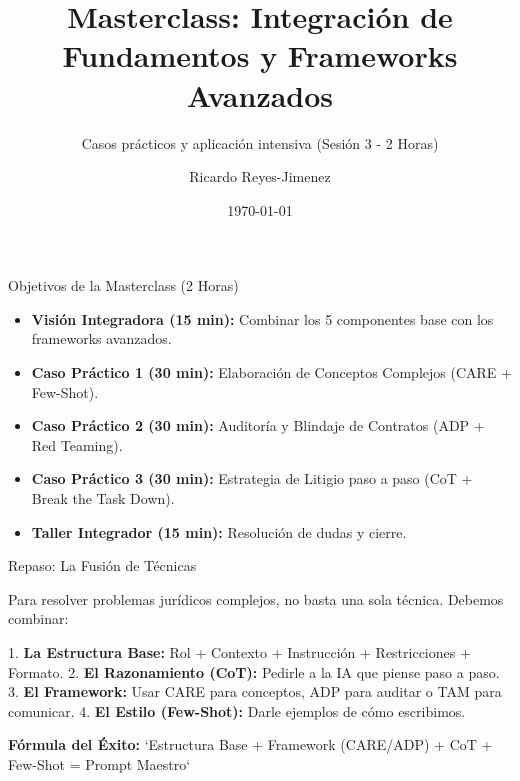 \documentclass[aspectratio=169]{beamer}
\title[ Masterclass]{ Masterclass: Integración de Fundamentos y Frameworks Avanzados}
\subtitle{ Casos prácticos y aplicación intensiva (Sesión 3 - 2 Horas)}
\author{Ricardo Reyes-Jimenez}
\institute{Universidad de La Sabana}
\date{\today}
\begin{document}
\begin{frame}
  \titlepage
\end{frame}

\usebackgroundtemplate{}



\begin{frame}[fragile]{Objetivos de la Masterclass (2 Horas)}


\begin{itemize}
  \item \textbf{Visión Integradora (15 min):} Combinar los 5 componentes base con los frameworks avanzados.
  \item \textbf{Caso Práctico 1 (30 min):} Elaboración de Conceptos Complejos (CARE + Few-Shot).
  \item \textbf{Caso Práctico 2 (30 min):} Auditoría y Blindaje de Contratos (ADP + Red Teaming).
  \item \textbf{Caso Práctico 3 (30 min):} Estrategia de Litigio paso a paso (CoT + Break the Task Down).
  \item \textbf{Taller Integrador (15 min):} Resolución de dudas y cierre.
\end{itemize}
\end{frame}



\begin{frame}[fragile]{Repaso: La Fusión de Técnicas}


Para resolver problemas jurídicos complejos, no basta una sola técnica. Debemos combinar:

1. \textbf{La Estructura Base:} Rol + Contexto + Instrucción + Restricciones + Formato.
2. \textbf{El Razonamiento (CoT):} Pedirle a la IA que piense paso a paso.
3. \textbf{El Framework:} Usar CARE para conceptos, ADP para auditar o TAM para comunicar.
4. \textbf{El Estilo (Few-Shot):} Darle ejemplos de cómo escribimos.

\textbf{Fórmula del Éxito:} `Estructura Base + Framework (CARE/ADP) + CoT + Few-Shot = Prompt Maestro`

\end{frame}
\end{document}
